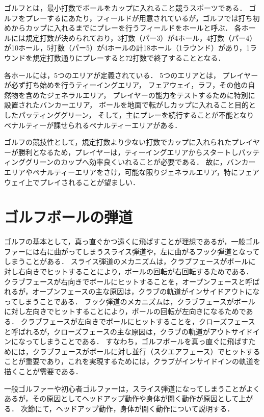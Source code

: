 ゴルフとは，最小打数でボールをカップに入れること競うスポーツである．
ゴルフをプレーするにあたり，フィールドが用意されているが，ゴルフでは打ち初めからカップに入れるまでにプレーを行うフィールドをホールと呼ぶ．
各ホールには規定打数が決められており，3打数（パー3）が4ホール，4打数（パー4）が10ホール，5打数（パー5）が4ホールの計18ホール（1ラウンド）があり，1ラウンドを規定打数通りにプレーすると72打数で終了することとなる．

各ホールには，5つのエリアが定義されている．
5つのエリアとは，
プレイヤーが必ず打ち始めを行うティーイングエリア，
フェアウェイ，ラフ，その他の自然物を含めたジェネラルエリア，
プレイヤーの能力をテストするために特別に設置されたバンカーエリア，
ボールを地面で転がしカップに入れること目的としたパッティンググリーン，
そして，主にプレーを続行することが不能となりペナルティーが課せられるペナルティーエリアがある．

ゴルフの競技性として，規定打数より少ない打数でカップに入れられたプレイヤーが勝利となるため，プレイヤーは，ティーイングエリアからスタートしパッティンググリーンのカップへ効率良くいれることが必要である．
故に，バンカーエリアやペナルティーエリアをさけ，可能な限りジェネラルエリア，特にフェアウェイ上でプレイされることが望ましい．

\section{ゴルフボールの弾道}
ゴルフの基本として，真っ直ぐかつ遠くに飛ばすことが理想であるが，一般ゴルファーには右に曲がってしまうスライス弾道や，左に曲がるフック弾道となってしまうことがある．
スライス弾道のメカニズムは，クラブフェースがボールに対し右向きでヒットすることにより，ボールの回転が右回転するためである．
クラブフェースが右向きでボールにヒットすることを，オープンフェースと呼ばれるが，オープンフェースの主な原因は，クラブの軌道がインサイドアウトになってしまうことである．
フック弾道のメカニズムは，クラブフェースがボールに対し左向きでヒットすることにより，ボールの回転が左向きになるためである．
クラブフェースが左向きでボールにヒットすることを，クローズフェースと呼ばれるが，クローズフェースの主な原因は，クラブの軌道がアウトサイドインになってしまうことである．
すなわち，ゴルフボールを真っ直ぐに飛ばすためには，クラブフェースがボールに対し並行（スクエアフェース）でヒットすることが重要であり，これを実現するためには，クラブがインサイドインの軌道を描くことが需要である．

一般ゴルファーや初心者ゴルファーは，スライス弾道になってしまうことがよくあるが，その原因としてヘッドアップ動作や身体が開く動作が原因として上がる．
次節にて，ヘッドアップ動作，身体が開く動作について説明する．

